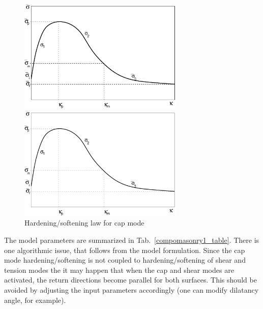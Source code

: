 \documentclass[a4paper]{article}
\begin{document}
\begin{figure}[!htb]
\begin{htmlonly}
  \centerline{\includegraphics[width=0.7\textwidth]{capmode.eps}}
\end{htmlonly}
\centerline{\includegraphics[width=0.7\textwidth]{capmode}}
\caption{Hardening/softening law for cap mode}
\label{hs3fig}
\end{figure}

The model parameters are summarized in Tab.~\ref{compomasonry1_table}.
There is one algorithmic issue, that follows from the model
formulation. Since the cap mode hardening/softening is not coupled to
hardening/softening of shear and tension modes the it may happen that
when the cap and shear modes are activated, the return directions
become parallel for both surfaces. This should be avoided by adjusting
the input parameters accordingly (one can modify dilatancy angle, for example).
\end{document}
